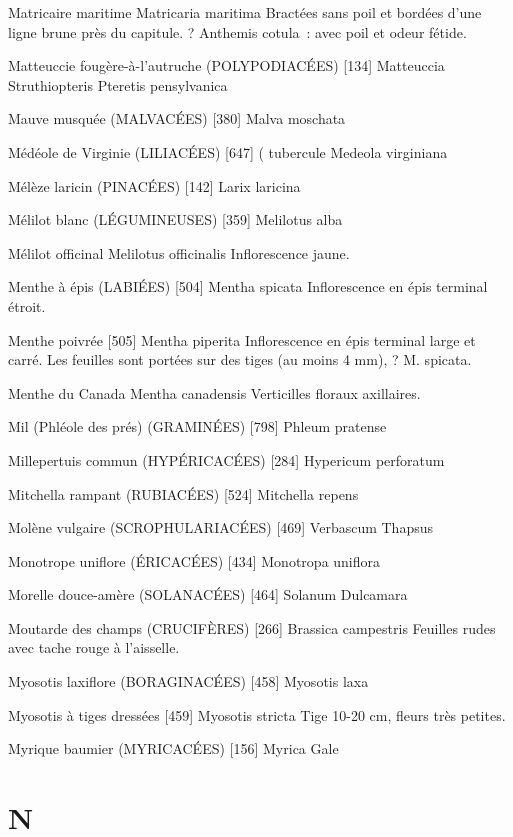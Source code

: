 Matricaire maritime
				Matricaria maritima
Bractées sans poil et bordées d’une ligne brune près du capitule.
? Anthemis cotula : avec poil et odeur fétide.

Matteuccie fougère-à-l’autruche (POLYPODIACÉES)  [134]
				Matteuccia Struthiopteris
				Pteretis pensylvanica

Mauve musquée (MALVACÉES)  [380]
				Malva moschata

Médéole de Virginie (LILIACÉES)  [647]			( tubercule
				Medeola virginiana

Mélèze laricin (PINACÉES) [142]
				Larix laricina

Mélilot blanc (LÉGUMINEUSES)  [359]
				Melilotus alba

Mélilot officinal
				Melilotus officinalis
Inflorescence jaune.

Menthe à épis (LABIÉES)  [504]
				Mentha spicata
Inflorescence en épis terminal étroit.

Menthe poivrée  [505]
				Mentha piperita
Inflorescence en épis terminal large et carré. Les feuilles sont portées sur des tiges (au moins 4 mm), ? M. spicata.

Menthe du Canada
				Mentha canadensis
Verticilles floraux axillaires.

Mil (Phléole des prés) (GRAMINÉES)  [798]
				Phleum pratense

Millepertuis commun (HYPÉRICACÉES)  [284]
				Hypericum perforatum

Mitchella rampant (RUBIACÉES)  [524]
				Mitchella repens

Molène vulgaire (SCROPHULARIACÉES)  [469]
				Verbascum Thapsus

Monotrope uniflore (ÉRICACÉES)  [434]
				Monotropa uniflora

Morelle douce-amère (SOLANACÉES)  [464]
				Solanum Dulcamara

Moutarde des champs (CRUCIFÈRES)  [266]
				Brassica campestris
Feuilles rudes avec tache rouge à l’aisselle.

Myosotis laxiflore (BORAGINACÉES)  [458]
				Myosotis laxa

Myosotis à tiges dressées  [459]
				Myosotis stricta
Tige 10-20 cm, fleurs très petites.

Myrique baumier (MYRICACÉES)  [156]
				Myrica Gale

\chapter*{N}

